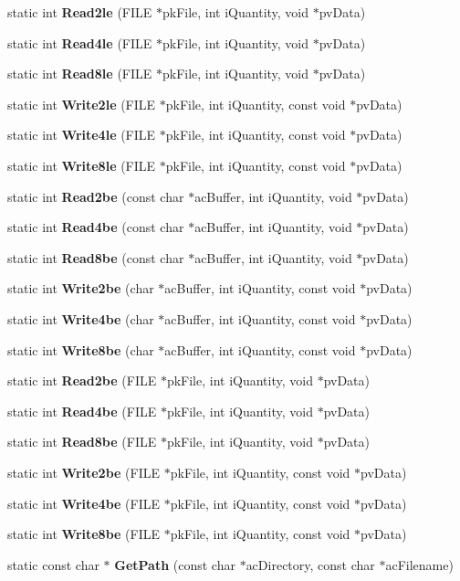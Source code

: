\begin{CompactItemize}
static int {\bf Read2le} (FILE $\ast$pk\-File, int i\-Quantity, void $\ast$pv\-Data)
\item 
static int {\bf Read4le} (FILE $\ast$pk\-File, int i\-Quantity, void $\ast$pv\-Data)
\item 
static int {\bf Read8le} (FILE $\ast$pk\-File, int i\-Quantity, void $\ast$pv\-Data)
\item 
static int {\bf Write2le} (FILE $\ast$pk\-File, int i\-Quantity, const void $\ast$pv\-Data)
\item 
static int {\bf Write4le} (FILE $\ast$pk\-File, int i\-Quantity, const void $\ast$pv\-Data)
\item 
static int {\bf Write8le} (FILE $\ast$pk\-File, int i\-Quantity, const void $\ast$pv\-Data)
\item 
static int {\bf Read2be} (const char $\ast$ac\-Buffer, int i\-Quantity, void $\ast$pv\-Data)
\item 
static int {\bf Read4be} (const char $\ast$ac\-Buffer, int i\-Quantity, void $\ast$pv\-Data)
\item 
static int {\bf Read8be} (const char $\ast$ac\-Buffer, int i\-Quantity, void $\ast$pv\-Data)
\item 
static int {\bf Write2be} (char $\ast$ac\-Buffer, int i\-Quantity, const void $\ast$pv\-Data)
\item 
static int {\bf Write4be} (char $\ast$ac\-Buffer, int i\-Quantity, const void $\ast$pv\-Data)
\item 
static int {\bf Write8be} (char $\ast$ac\-Buffer, int i\-Quantity, const void $\ast$pv\-Data)
\item 
static int {\bf Read2be} (FILE $\ast$pk\-File, int i\-Quantity, void $\ast$pv\-Data)
\item 
static int {\bf Read4be} (FILE $\ast$pk\-File, int i\-Quantity, void $\ast$pv\-Data)
\item 
static int {\bf Read8be} (FILE $\ast$pk\-File, int i\-Quantity, void $\ast$pv\-Data)
\item 
static int {\bf Write2be} (FILE $\ast$pk\-File, int i\-Quantity, const void $\ast$pv\-Data)
\item 
static int {\bf Write4be} (FILE $\ast$pk\-File, int i\-Quantity, const void $\ast$pv\-Data)
\item 
static int {\bf Write8be} (FILE $\ast$pk\-File, int i\-Quantity, const void $\ast$pv\-Data)
\item 
static const char $\ast$ {\bf Get\-Path} (const char $\ast$ac\-Directory, const char $\ast$ac\-Filename)
\item 

\end{CompactItemize}
